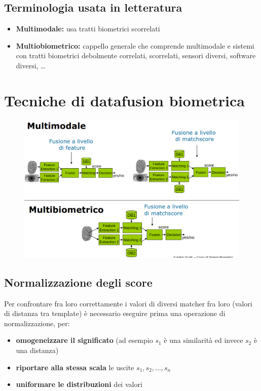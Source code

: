 \documentclass{report}
\begin{document}
\section{Terminologia usata in letteratura}
\begin{itemize}
    \item \textbf{Multimodale:} usa tratti biometrici scorrelati
    \item \textbf{Multiobiometrico:} cappello generale che comprende multimodale e sistemi 
    con tratti biometrici debolmente correlati, scorrelati, sensori diversi, software diversi, \dots
\end{itemize}


\chapter{Tecniche di datafusion biometrica}

\begin{figure}[H]
    \centering
    \includegraphics[width=1\linewidth]{images/schemi-fusion.png}
\end{figure}

\section{Normalizzazione degli score}
Per confrontare fra loro correttamente i valori di diversi 
matcher fra loro (valori di distanza tra template) è necessario eseguire 
prima una operazione di normalizzazione, per:
\begin{itemize}
    \item \textbf{omogeneizzare il significato} (ad esempio $s_1$ è una similarità 
    ed invece $s_2$ è una distanza)
    \item \textbf{riportare alla stessa scala} le uscite $s_1, s_2, \dots, s_n$
    \item \textbf{uniformare le distribuzioni} dei valori 
\end{itemize}
\end{document}
